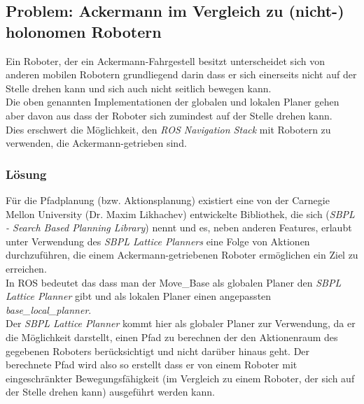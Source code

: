 \documentclass[oribibl]{llncs}
\begin{document}
\subsection{Problem: Ackermann im Vergleich zu (nicht-) holonomen Robotern}
Ein Roboter, der ein Ackermann-Fahrgestell besitzt unterscheidet sich von anderen mobilen Robotern grundliegend darin dass er sich einerseits nicht auf der Stelle drehen kann und sich auch nicht seitlich bewegen kann.\\
Die oben genannten Implementationen der globalen und lokalen Planer gehen aber davon aus dass der Roboter sich zumindest auf der Stelle drehen kann.\\
Dies erschwert die Möglichkeit, den \textit{ROS Navigation Stack} mit Robotern zu verwenden, die Ackermann-getrieben sind.\cite{ackermannGroup}
\subsubsection{Lösung}
Für die Pfadplanung (bzw. Aktionsplanung) existiert eine von der Carnegie Mellon University (Dr. Maxim Likhachev\cite{likhachev}) entwickelte Bibliothek, die sich (\textit{SBPL - Search Based Planning Library}\cite{sbplMain}) nennt und es, neben anderen Features, erlaubt unter Verwendung des \textit{SBPL Lattice Planners} eine Folge von Aktionen durchzuführen, die einem Ackermann-getriebenen Roboter ermöglichen ein Ziel zu erreichen.\\
In ROS bedeutet das dass man der Move\_Base als globalen Planer den \textit{SBPL Lattice Planner} gibt und als lokalen Planer einen angepassten \textit{base\_local\_planner}.\\
Der \textit{SBPL Lattice Planner} kommt hier als globaler Planer zur Verwendung, da er die Möglichkeit darstellt, einen Pfad zu berechnen der den Aktionenraum des gegebenen Roboters berücksichtigt und nicht darüber hinaus geht. Der berechnete Pfad wird also so erstellt dass er von einem Roboter mit eingeschränkter Bewegungsfähigkeit (im Vergleich zu einem Roboter, der sich auf der Stelle drehen kann) ausgeführt werden kann.
\newpage
\end{document}
